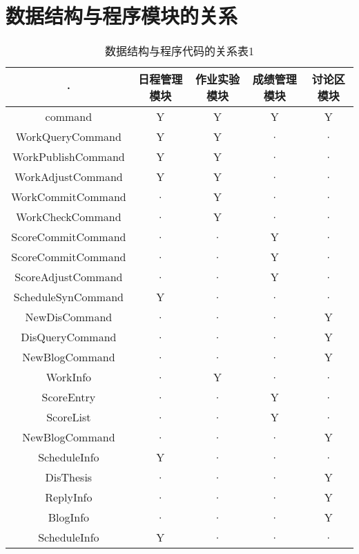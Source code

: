 \section{数据结构与程序模块的关系}
\begin{table}[htbp]
\centering
\caption{数据结构与程序代码的关系表1} \label{tab:datastructure-module}
\begin{tabular}{|c|c|c|c|c|}
    \hline
    · & 日程管理模块 & 作业实验模块 & 成绩管理模块 & 讨论区模块 \\
    \hline
    command & Y & Y & Y & Y \\
    \hline
    WorkQueryCommand & Y & Y & · & ·  \\
    \hline
    WorkPublishCommand & Y & Y & · & · \\
    \hline
    WorkAdjustCommand & Y & Y & · & · \\
    \hline
    WorkCommitCommand & · & Y & · & · \\
    \hline
    WorkCheckCommand & · & Y & · & · \\
    \hline
    ScoreCommitCommand & · & · & Y & · \\
    \hline
    ScoreCommitCommand & · & · & Y & · \\
    \hline
    ScoreAdjustCommand & · & · & Y & · \\
    \hline
    ScheduleSynCommand & Y & · & · & · \\
    \hline
    NewDisCommand & · & · & · & Y \\
    \hline
    DisQueryCommand & · & · & · & Y \\
    \hline
    NewBlogCommand & · & · & · & Y \\
    \hline
    WorkInfo & · & Y & · & · \\
    \hline
    ScoreEntry & · & · & Y & · \\
    \hline
    ScoreList & · & · & Y & · \\
    \hline
    NewBlogCommand & · & · & · & Y \\
    \hline
    ScheduleInfo & Y & · & · & · \\
    \hline
    DisThesis & · & · & · & Y \\
    \hline
    ReplyInfo & · & · & · & Y \\
    \hline
    BlogInfo & · & · & · & Y \\
    \hline
    ScheduleInfo & Y & · & · & · \\
    \hline
\end{tabular}
\end{table}

